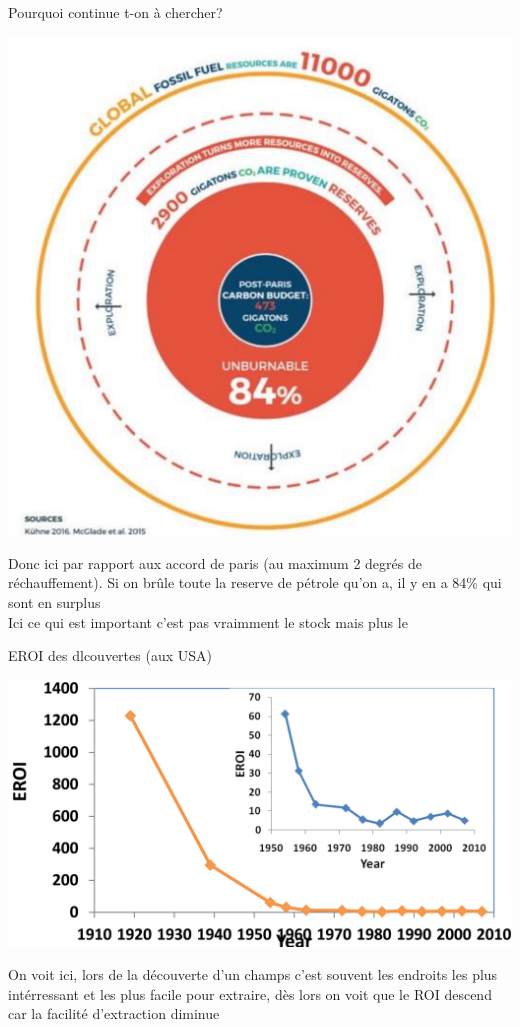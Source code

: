 \begin{parag}{Pourquoi continue t-on à chercher?}
	\begin{center}
	\includegraphics[scale=0.2]{42025-09-23.png}
	\end{center}
	
    Donc ici par rapport aux accord de paris (au maximum 2 degrés de réchauffement). Si on brûle toute la reserve de pétrole qu'on a, il y en a 84\% qui sont en surplus\\
    Ici ce qui est important c'est pas vraimment le stock mais plus le 

\end{parag}
\begin{parag}{EROI des dlcouvertes (aux USA)}
	\begin{center}
	    
	\includegraphics[scale=0.2]{62025-09-23.png}
	\end{center}
	
	On voit ici, lors de la découverte d'un champs c'est souvent les endroits les plus intérressant et les plus facile pour extraire, dès lors on voit que le ROI descend car la facilité d'extraction diminue
    
\end{parag}
